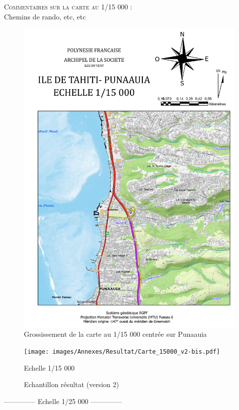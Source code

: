 \documentclass{themeensg}
\begin{document}
\begin{appendices}
\vspace{3cm}
\textsc{Commentaires sur la carte au 1/15 000 :}\\
Chemins de rando, etc, etc
\begin{figure}[!h]
\centering
\includegraphics[width=\linewidth]{images/Annexes/Resultat/Carte_15000_A4.pdf}
\caption{Grossissement de la carte au 1/15 000 centrée sur Punaauia}
\label{15000_gros}
\end{figure}

\begin{figure}
\centering
\texttt{[image: images/Annexes/Resultat/Carte\_15000\_v2-bis.pdf]}%
\caption{Echantillon résultat (version 2) }
\colorbox{yellow!10}{Echelle 1/15 000}
\label{15000 v2}%
\end{figure}

\clearpage
\begin{center}
    \Large
    \colorbox{green!10}{--------------\- Echelle 1/25 000 --------------\-}
\end{center}


\end{appendices}
\end{document}
